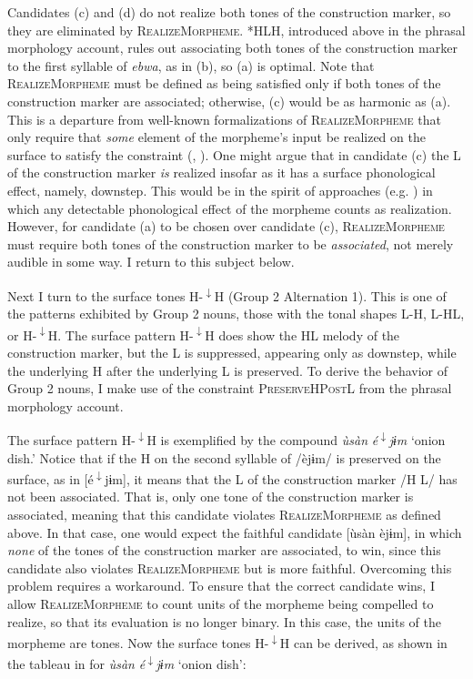 \documentclass[output=paper]{langscibook}
\begin{document}
Candidates (c) and (d) do not realize both tones of the construction marker, so they are eliminated by \textsc{RealizeMorpheme}. *HLH, introduced above in the phrasal morphology account, rules out associating both tones of the construction marker to the first syllable of \textit{ebwa}, as in (b), so (a) is optimal. Note that \textsc{RealizeMorpheme} must be defined as being satisfied only if both tones of the construction marker are associated; otherwise, (c) would be as harmonic as (a). This is a departure from well-known formalizations of \textsc{RealizeMorpheme} that only require that \textit{some} element of the morpheme’s input be realized on the surface to satisfy the constraint (\citealt{Gnanadesikan1997}, \citealt{Oostendorp2005}). One might argue that in candidate (c) the L of the construction marker \textit{is} realized insofar as it has a surface phonological effect, namely, downstep. This would be in the spirit of approaches (e.g. \citealt{Gnanadesikan1997}) in which any detectable phonological effect of the morpheme counts as realization. However, for candidate (a) to be chosen over candidate (c), \textsc{RealizeMorpheme} must require both tones of the construction marker to be \textit{associated}, not merely audible in some way. I return to this subject below. 

Next I turn to the surface tones H-\textsuperscript{$\downarrow$}H (Group 2 Alternation 1). This is one of the patterns exhibited by Group 2 nouns, those with the tonal shapes L-H, L-HL, or H-\textsuperscript{$\downarrow$}H. The surface pattern H-\textsuperscript{$\downarrow$}H does show the HL melody of the construction marker, but the L is suppressed, appearing only as downstep, while the underlying H after the underlying L is preserved. To derive the behavior of Group 2 nouns, I make use of the constraint \textsc{PreserveHPostL} from the phrasal morphology account. 

The surface pattern H-\textsuperscript{$\downarrow$}H is exemplified by the compound \textit{ùsàn} \textit{é\textsuperscript{$\downarrow$}}\textit{jɨm} ‘onion dish.’ Notice that if the H on the second syllable of /èjɨm/ is preserved on the surface, as in [é\textsuperscript{$\downarrow$}jɨm], it means that the L of the construction marker /H L/ has not been associated. That is, only one tone of the construction marker is associated, meaning that this candidate violates \textsc{RealizeMorpheme} as defined above. In that case, one would expect the faithful candidate [ùsàn èjɨm], in which \textit{none} of the tones of the construction marker are associated, to win, since this candidate also violates \textsc{RealizeMorpheme} but is more faithful. Overcoming this problem requires a workaround. To ensure that the correct candidate wins, I allow \textsc{RealizeMorpheme} to count units of the morpheme being compelled to realize, so that its evaluation is no longer binary. In this case, the units of the morpheme are tones. Now the surface tones H-\textsuperscript{$\downarrow$}H can be derived, as shown in the tableau in  for \textit{ùsàn} \textit{é\textsuperscript{$\downarrow$}}\textit{jɨm} ‘onion dish’: 
\end{document}
